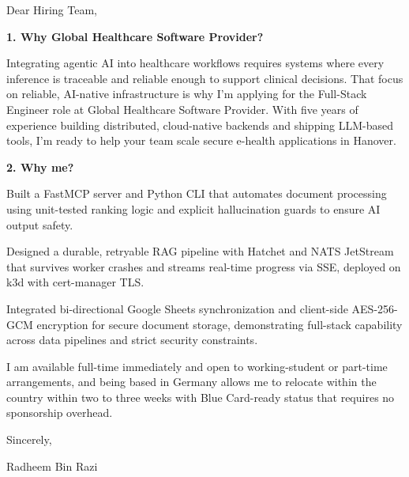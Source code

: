 \documentclass[11pt,a4paper]{coverletter}
\begin{document}

\opening{Dear Hiring Team,}

\vspace{8pt}\noindent\textbf{1. Why Global Healthcare Software Provider?}\par\vspace{3pt}

Integrating agentic AI into healthcare workflows requires systems where every inference is traceable and reliable enough to support clinical decisions. That focus on reliable, AI-native infrastructure is why I'm applying for the Full-Stack Engineer role at Global Healthcare Software Provider. With five years of experience building distributed, cloud-native backends and shipping LLM-based tools, I'm ready to help your team scale secure e-health applications in Hanover.

\vspace{8pt}\noindent\textbf{2. Why me?}\par\vspace{3pt}

\bullets

  \item Built a FastMCP server and Python CLI that automates document processing using unit-tested ranking logic and explicit hallucination guards to ensure AI output safety.

  \item Designed a durable, retryable RAG pipeline with Hatchet and NATS JetStream that survives worker crashes and streams real-time progress via SSE, deployed on k3d with cert-manager TLS.

  \item Integrated bi-directional Google Sheets synchronization and client-side AES-256-GCM encryption for secure document storage, demonstrating full-stack capability across data pipelines and strict security constraints.

\bulletsend

I am available full-time immediately and open to working-student or part-time arrangements, and being based in Germany allows me to relocate within the country within two to three weeks with Blue Card-ready status that requires no sponsorship overhead.

\closing{Sincerely,}{Radheem Bin Razi}

\clearpage
{}

\end{document}
